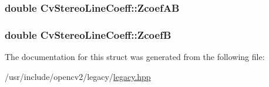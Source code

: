 \hypertarget{structCvStereoLineCoeff_a61e95e05fc766d5e629014cfff1aa6ab}{
\subsubsection[{Zcoef\-A\-B}]{\setlength{\rightskip}{0pt plus 5cm}double Cv\-Stereo\-Line\-Coeff\-::\-Zcoef\-A\-B}}\label{structCvStereoLineCoeff_a61e95e05fc766d5e629014cfff1aa6ab}
\hypertarget{structCvStereoLineCoeff_a700fbf82f7a601a1518d58f14d7d0819}{
\subsubsection[{Zcoef\-B}]{\setlength{\rightskip}{0pt plus 5cm}double Cv\-Stereo\-Line\-Coeff\-::\-Zcoef\-B}}\label{structCvStereoLineCoeff_a700fbf82f7a601a1518d58f14d7d0819}


The documentation for this struct was generated from the following file\-:\begin{DoxyCompactItemize}
\item 
/usr/include/opencv2/legacy/\hyperlink{legacy_8hpp}{legacy.\-hpp}\end{DoxyCompactItemize}
